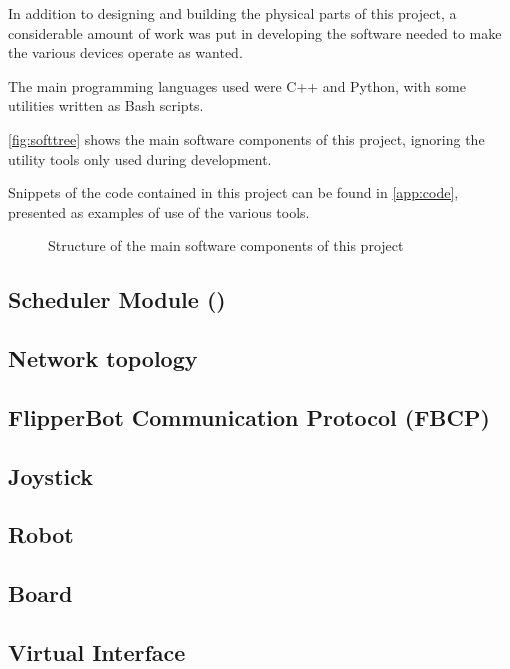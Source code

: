 In addition to designing and building the physical parts of this
project, a considerable amount of work was put in developing the
software needed to make the various devices operate as wanted.

The main programming languages used were C++ and Python, with some
utilities written as Bash scripts.

\autoref{fig:softtree} shows the main software components of this project,
ignoring the utility tools only used during development.

Snippets of the code contained in this project can be found in
\autoref{app:code}, presented as examples of use of the various tools.

\begin{figure}[htbp]
  
  \caption{Structure of the main software components of this project}
  \label{fig:softtree}
\end{figure}

\subsection{Scheduler Module (\ScheMo{})}
  \label{ssec:schemo}
  

\subsection{Network topology}
  \label{ssec:network}
  

\subsection{FlipperBot Communication Protocol (FBCP)}
  \label{ssec:fbcp}
  
  
\subsection{Joystick}
  \label{ssec:contr}
  

\subsection{Robot}
  \label{ssec:robot}
  

\subsection{Board}
  \label{ssec:board}
  
  
\subsection{Virtual Interface}
  \label{ssec:vcontr}
  
